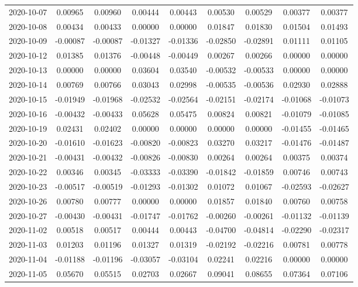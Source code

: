 \begin{footnotesize}
\begin{longtable}{lcccccccc}
2020-10-07 & 0.00965 & 0.00960 & 0.00444 & 0.00443 & 0.00530 & 0.00529 & 0.00377 & 0.00377 \\
2020-10-08 & 0.00434 & 0.00433 & 0.00000 & 0.00000 & 0.01847 & 0.01830 & 0.01504 & 0.01493 \\
2020-10-09 & -0.00087 & -0.00087 & -0.01327 & -0.01336 & -0.02850 & -0.02891 & 0.01111 & 0.01105 \\
2020-10-12 & 0.01385 & 0.01376 & -0.00448 & -0.00449 & 0.00267 & 0.00266 & 0.00000 & 0.00000 \\
2020-10-13 & 0.00000 & 0.00000 & 0.03604 & 0.03540 & -0.00532 & -0.00533 & 0.00000 & 0.00000 \\
2020-10-14 & 0.00769 & 0.00766 & 0.03043 & 0.02998 & -0.00535 & -0.00536 & 0.02930 & 0.02888 \\
2020-10-15 & -0.01949 & -0.01968 & -0.02532 & -0.02564 & -0.02151 & -0.02174 & -0.01068 & -0.01073 \\
2020-10-16 & -0.00432 & -0.00433 & 0.05628 & 0.05475 & 0.00824 & 0.00821 & -0.01079 & -0.01085 \\
2020-10-19 & 0.02431 & 0.02402 & 0.00000 & 0.00000 & 0.00000 & 0.00000 & -0.01455 & -0.01465 \\
2020-10-20 & -0.01610 & -0.01623 & -0.00820 & -0.00823 & 0.03270 & 0.03217 & -0.01476 & -0.01487 \\
2020-10-21 & -0.00431 & -0.00432 & -0.00826 & -0.00830 & 0.00264 & 0.00264 & 0.00375 & 0.00374 \\
2020-10-22 & 0.00346 & 0.00345 & -0.03333 & -0.03390 & -0.01842 & -0.01859 & 0.00746 & 0.00743 \\
2020-10-23 & -0.00517 & -0.00519 & -0.01293 & -0.01302 & 0.01072 & 0.01067 & -0.02593 & -0.02627 \\
2020-10-26 & 0.00780 & 0.00777 & 0.00000 & 0.00000 & 0.01857 & 0.01840 & 0.00760 & 0.00758 \\
2020-10-27 & -0.00430 & -0.00431 & -0.01747 & -0.01762 & -0.00260 & -0.00261 & -0.01132 & -0.01139 \\
2020-11-02 & 0.00518 & 0.00517 & 0.00444 & 0.00443 & -0.04700 & -0.04814 & -0.02290 & -0.02317 \\
2020-11-03 & 0.01203 & 0.01196 & 0.01327 & 0.01319 & -0.02192 & -0.02216 & 0.00781 & 0.00778 \\
2020-11-04 & -0.01188 & -0.01196 & -0.03057 & -0.03104 & 0.02241 & 0.02216 & 0.00000 & 0.00000 \\
2020-11-05 & 0.05670 & 0.05515 & 0.02703 & 0.02667 & 0.09041 & 0.08655 & 0.07364 & 0.07106 \\

\end{longtable}
\end{footnotesize}

